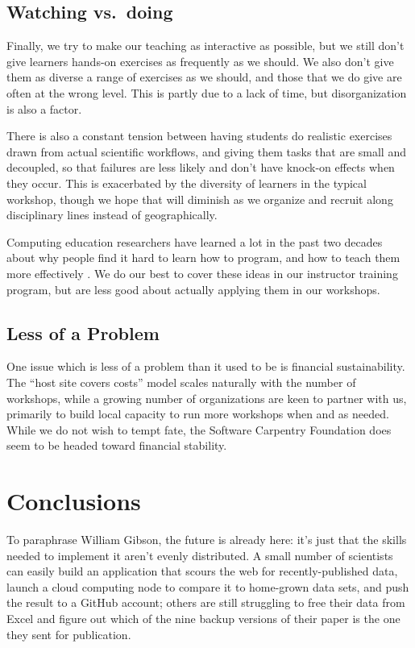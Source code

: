 \documentclass[10pt,a4paper,twocolumn]{article}
\begin{document}
\subsection*{Watching vs.~doing}

Finally, we try to make our teaching as interactive as possible, but
we still don't give learners hands-on exercises as frequently as we
should.  We also don't give them as diverse a range of exercises as we
should, and those that we do give are often at the wrong level. This
is partly due to a lack of time, but disorganization is also a factor.

There is also a constant tension between having students do realistic
exercises drawn from actual scientific workflows, and giving them tasks
that are small and decoupled, so that failures are less likely and don't
have knock-on effects when they occur. This is exacerbated by the
diversity of learners in the typical workshop, though we hope that will
diminish as we organize and recruit along disciplinary lines instead of
geographically.

Computing education researchers have learned a lot in the past two
decades about why people find it hard to learn how to program, and how
to teach them more effectively
\cite{guzdial2010,guzdial2013,hazzan2011,porter2013,sorva2012}.  We
do our best to cover these ideas in our instructor training program,
but are less good about actually applying them in our workshops.

\subsection*{Less of a Problem}

One issue which is less of a problem than it used to be is financial
sustainability. The ``host site covers costs'' model scales naturally
with the number of workshops, while a growing number of organizations
are keen to partner with us, primarily to build local capacity to run
more workshops when and as needed.  While we do not wish to tempt
fate, the Software Carpentry Foundation does seem to be headed toward
financial stability.

\section*{Conclusions}

To paraphrase William Gibson, the future is already here: it's just
that the skills needed to implement it aren't evenly distributed. A
small number of scientists can easily build an application that scours
the web for recently-published data, launch a cloud computing node to
compare it to home-grown data sets, and push the result to a GitHub
account; others are still struggling to free their data from Excel and
figure out which of the nine backup versions of their paper is the one
they sent for publication.
\end{document}
